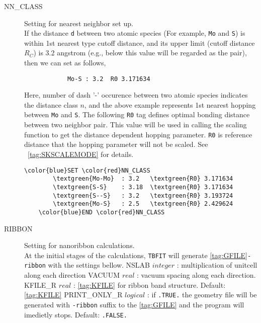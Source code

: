 \documentclass[a4paper,12pt]{scrartcl}
\makeatletter
\def\namedlabel#1#2{\begingroup
    #2%
    \def\@currentlabel{#2}%
    \phantomsection\label{#1}\endgroup
}
\newcommand{\tbfitname}{\textcolor{blue!85!white}{\texttt{TBFIT}}}
\newcommand{\textgreen}[1]{\textcolor{green!50!black}{\texttt{#1}}}
\makeatother
\begin{document}
\begin{description}
 	\item[\namedlabel{tag:NNCLASS}{NN\_CLASS}] 
		Setting for nearest neighbor set up. \\
		If the distance \texttt{d} between two atomic species (For example, \texttt{Mo} 
		and \texttt{S}) is within 1st nearest type cutoff distance, and its upper limit (cutoff distance $R_C$) is 3.2 
		angstrom (e.g., below this value will be regarded as the pair), then
		we can set as follows,
        \begin{verbatim}
         	Mo-S : 3.2  R0 3.171634
        \end{verbatim}  

		Here, number of dash '-' occurence between two atomic species indicates 
		the distance class $n$, and the above example represents 1st nearest 
		hopping between \texttt{Mo} and \texttt{S}. The following \texttt{R0} 
		tag defines optimal bonding distance between two neighbor pair. 
		This value will be used in calling the scaling function to get 
		the distance dependent hopping parameter. \texttt{R0} is reference distance that the hopping parameter will not be scaled. See ~\ref{tag:SKSCALEMODE} for details.

 \begin{Verbatim}[commandchars=\\\{\},gobble=4, frame=single, framesep=2mm, 
    label= NN\_CLASS setup example,
    labelposition=bottomline]
    \color{blue}SET \color{red}NN_CLASS
        \textgreen{Mo-Mo}  : 3.2   \textgreen{R0} 3.171634
        \textgreen{S-S}    : 3.18  \textgreen{R0} 3.171634  
        \textgreen{S--S}   : 3.2   \textgreen{R0} 3.193724  
        \textgreen{Mo-S}   : 2.5   \textgreen{R0} 2.429624  
    \color{blue}END \color{red}NN_CLASS
 \end{Verbatim}


 	\item[\namedlabel{tag:RIBBON}{RIBBON}] 
		Setting for nanoribbon calculations. \\
		At the initial stages of the calculations, \tbfitname{} will generate
		\ref{tag:GFILE}\texttt{-ribbon} with the settings bellow.
		\subitem NSLAB $integer$ : multiplication of unitcell along each direction 
		\subitem VACUUM  $real$  : vacuum spacing along each direction.  
		\subitem KFILE\_R $real$  : \ref{tag:KFILE} for ribbon band structure. 
			Default: \ref{tag:KFILE}
		\subitem PRINT\_ONLY\_R $logical$  : if \texttt{.TRUE.} the geometry 
		file will be generated with \texttt{-ribbon} suffix to the \ref{tag:GFILE}
		and the program will imedietly stops. Default: \texttt{.FALSE.}
		

\end{description}
\end{document}
